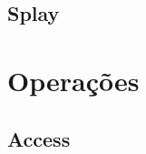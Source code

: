 \subsection{Splay}
\label{subsection:lct-splay-splay}

\section{Operações}
\label{sec:lct-operacoes}

\subsection{Access}
\label{subsection:lct-access}